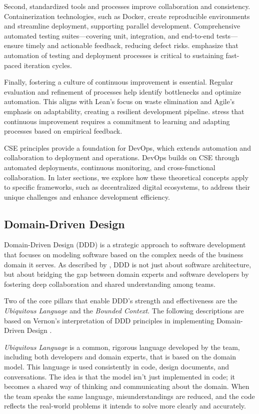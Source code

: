 Second, standardized tools and processes improve collaboration and consistency. Containerization technologies, such as Docker, create reproducible environments and streamline deployment, supporting parallel development. Comprehensive automated testing suites—covering unit, integration, and end-to-end tests—ensure timely and actionable feedback, reducing defect risks. \citet{fitzgerald2015continuous} emphasize that automation of testing and deployment processes is critical to sustaining fast-paced iteration cycles.

Finally, fostering a culture of continuous improvement is essential. Regular evaluation and refinement of processes help identify bottlenecks and optimize automation. This aligns with Lean’s focus on waste elimination and Agile’s emphasis on adaptability, creating a resilient development pipeline. \citet{poppendieck2003lean} stress that continuous improvement requires a commitment to learning and adapting processes based on empirical feedback.

CSE principles provide a foundation for DevOps, which extends automation and collaboration to deployment and operations. DevOps builds on CSE through automated deployments, continuous monitoring, and cross-functional collaboration. In later sections, we explore how these theoretical concepts apply to specific frameworks, such as decentralized digital ecosystems, to address their unique challenges and enhance development efficiency.

\subsection{Domain-Driven Design} \label{domain_driven_design}
Domain-Driven Design (DDD) is a strategic approach to software development that focuses on modeling software based on the complex needs of the business domain it serves. As described by \citet{vernon2013DDD}, DDD is not just about software architecture, but about bridging the gap between domain experts and software developers by fostering deep collaboration and shared understanding among teams.

Two of the core pillars that enable DDD’s strength and effectiveness are the \emph{Ubiquitous Language} and the \emph{Bounded Context}. The following descriptions are based on Vernon’s interpretation of DDD principles in implementing Domain-Driven Design \citep{vernon2013DDD}.

\emph{Ubiquitous Language} is a common, rigorous language developed by the team, including both developers and domain experts, that is based on the domain model. This language is used consistently in code, design documents, and conversations. The idea is that the model isn't just implemented in code; it becomes a shared way of thinking and communicating about the domain. When the team speaks the same language, misunderstandings are reduced, and the code reflects the real-world problems it intends to solve more clearly and accurately. 

